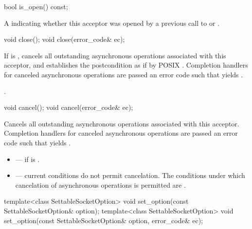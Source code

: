 \begin{itemdecl}
bool is_open() const;
\end{itemdecl}

\begin{itemdescr}
\pnum
\returns A  indicating whether this acceptor was opened by a previous call to  or .
\end{itemdescr}

\begin{itemdecl}
void close();
void close(error_code& ec);
\end{itemdecl}

\begin{itemdescr}
\pnum
\effects If  is , cancels all outstanding asynchronous operations associated with this acceptor, and establishes the postcondition as if by POSIX . Completion handlers for canceled asynchronous operations are passed an error code  such that  yields .

\pnum
\postconditions {}.
\end{itemdescr}

\begin{itemdecl}
void cancel();
void cancel(error_code& ec);
\end{itemdecl}

\begin{itemdescr}
\pnum
\effects Cancels all outstanding asynchronous operations associated with this acceptor. Completion handlers for canceled asynchronous operations are passed an error code  such that  yields .

\pnum
\errors
\begin{itemize}
\item
{} --- if  is .
\item
{} --- current conditions do not permit cancelation. The conditions under which cancelation of asynchronous operations is permitted are .
\end{itemize}
\end{itemdescr}

\begin{itemdecl}
template<class SettableSocketOption>
  void set_option(const SettableSocketOption& option);
template<class SettableSocketOption>
  void set_option(const SettableSocketOption& option, error_code& ec);
\end{itemdecl}

